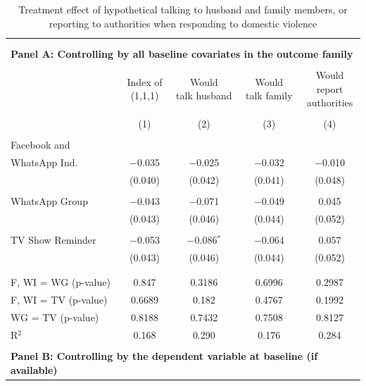 \documentclass[12pt]{article}
\begin{document}
\begin{table}[H] \centering 
  \caption{Treatment effect of hypothetical talking to husband and family members, or reporting to authorities when responding to domestic violence} 
  \label{} 
\footnotesize 
\begin{tabular}{@{\extracolsep{20pt}}lcccc} 
\\[-1.8ex]\hline 
\hline \\[-1.8ex] 
\\[-0.5ex] 
\multicolumn{5}{l}{\textbf{Panel A: Controlling by all baseline covariates in the outcome family}} \\
\hline \\[-1ex] 
 & \shortstack{Index of \\ (1,1,1)} & \shortstack{Would \\ talk husband} & \shortstack{Would \\ talk family} & \shortstack{Would \\ report \\ authorities} \\ 
\\[-1.8ex] & (1) & (2) & (3) & (4)\\ 
\hline \\[-1.8ex] 
 Facebook and \\ WhatsApp Ind. & $-$0.035 & $-$0.025 & $-$0.032 & $-$0.010 \\ 
  & (0.040) & (0.042) & (0.041) & (0.048) \\ 
  & & & & \\ 
 WhatsApp Group & $-$0.043 & $-$0.071 & $-$0.049 & 0.045 \\ 
  & (0.043) & (0.046) & (0.044) & (0.052) \\ 
  & & & & \\ 
 TV Show Reminder & $-$0.053 & $-$0.086$^{*}$ & $-$0.064 & 0.057 \\ 
  & (0.043) & (0.046) & (0.044) & (0.052) \\ 
  & & & & \\ 
\hline \\[-1.8ex] 
F, WI = WG (p-value) & 0.847 & 0.3186 & 0.6996 & 0.2987 \\ 
F, WI = TV (p-value) & 0.6689 & 0.182 & 0.4767 & 0.1992 \\ 
WG = TV (p-value) & 0.8188 & 0.7432 & 0.7508 & 0.8127 \\ 
R$^{2}$ & 0.168 & 0.290 & 0.176 & 0.284 \\ 
\hline 
\\[-0.5ex] 
\multicolumn{5}{l}{\textbf{Panel B: Controlling by the dependent variable at baseline (if available)}} \\

\end{tabular}
\end{table}
\end{document}
